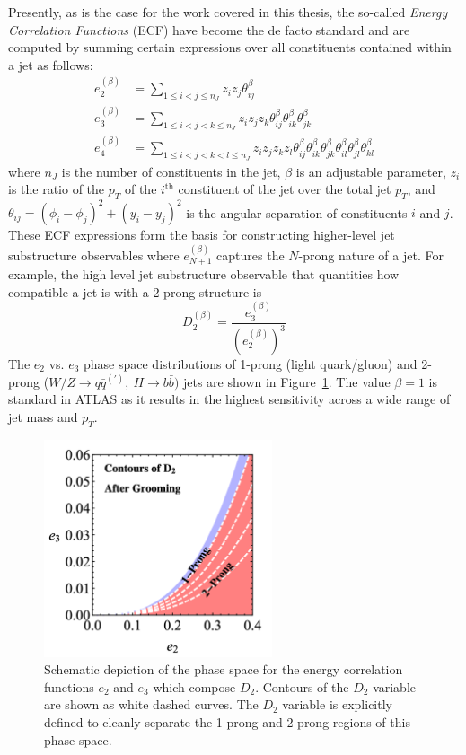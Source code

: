 Presently, as is the case for the work covered in this thesis, the so-called \textit{Energy Correlation Functions} (ECF) \cite{Larkoski:2013eya, Moult:2016cvt} have become the de facto standard and are computed by summing certain expressions over all constituents contained within a jet as follows:
\begin{align}
    e_2^{(\beta)} &= \sum_{1 \le i < j \le n_J} z_i z_j \theta_{ij}^\beta \\
    e_3^{(\beta)} &= \sum_{1 \le i < j < k \le n_J} z_i z_j z_k \theta_{ij}^\beta \theta_{ik}^\beta \theta_{jk}^\beta \\
    e_4^{(\beta)} &= \sum_{1 \le i < j < k < l \le n_J} z_i z_j z_k z_l \theta_{ij}^\beta \theta_{ik}^\beta \theta_{jk}^\beta \theta_{il}^\beta \theta_{jl}^\beta \theta_{kl}^\beta
\end{align}
where $n_J$ is the number of constituents in the jet, $\beta$ is an adjustable parameter, $z_i$ is the ratio of the $p_T$ of the $i^{\mathrm{th}}$ constituent of the jet over the total jet $p_T$, and $\theta_{ij} = (\phi_i - \phi_j)^2 + (y_i - y_j)^2$ is the angular separation of constituents $i$ and $j$.
These ECF expressions form the basis for constructing higher-level jet substructure observables where $e_{N+1}^{(\beta)}$ captures the $N$-prong nature of a jet. For example, the high level jet substructure observable that quantities how compatible a jet is with a 2-prong structure is
\begin{equation}
    D_2^{(\beta)} = \frac{e_3^{(\beta)}}{\left( e_2^{(\beta)} \right)^3} \end{equation}
The $e_2$ vs. $e_3$ phase space distributions of 1-prong (light quark/gluon) and 2-prong ($W/Z \rightarrow q\bar{q}^{(\prime)},\ H \rightarrow b\bar{b})$ jets are shown in Figure~\ref{fig:d2_plane_contours}.
The value $\beta = 1$ is standard in ATLAS as it results in the highest sensitivity across a wide range of jet mass and $p_T$.

\begin{figure}
	\centering
	\includegraphics[width=0.6\textwidth]{d2_plane_contours}
	\caption{
	Schematic depiction of the phase space for the energy correlation functions $e_2$ and $e_3$ which compose $D_2$.
	Contours of the $D_2$ variable are shown as white dashed curves.
	The $D_2$ variable is explicitly defined to cleanly separate the 1-prong and 2-prong regions of this phase space.
    \cite{Moult:2016cvt}
	}
	\label{fig:d2_plane_contours}
\end{figure}

